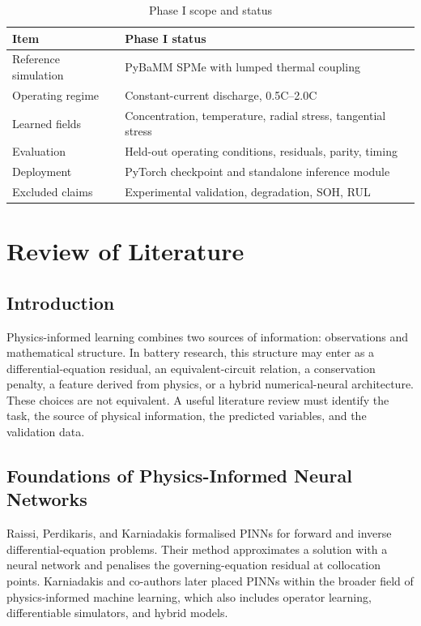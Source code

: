 \documentclass[14pt,a4paper,oneside]{extreport}
\begin{document}
\begin{table}[htbp]
\centering
\caption{Phase I scope and status}
\small
\begin{tabularx}{\textwidth}{p{}X}
\toprule
Item & Phase I status\\
\midrule
Reference simulation & PyBaMM SPMe with lumped thermal coupling\\
Operating regime & Constant-current discharge, 0.5C--2.0C\\
Learned fields & Concentration, temperature, radial stress, tangential stress\\
Evaluation & Held-out operating conditions, residuals, parity, timing\\
Deployment & PyTorch checkpoint and standalone inference module\\
Excluded claims & Experimental validation, degradation, SOH, RUL\\
\bottomrule
\end{tabularx}
\end{table}

\chapter{Review of Literature}
\section{Introduction}
Physics-informed learning combines two sources of information: observations and mathematical structure. In battery research, this structure may enter as a differential-equation residual, an equivalent-circuit relation, a conservation penalty, a feature derived from physics, or a hybrid numerical-neural architecture. These choices are not equivalent. A useful literature review must identify the task, the source of physical information, the predicted variables, and the validation data.

\section{Foundations of Physics-Informed Neural Networks}
Raissi, Perdikaris, and Karniadakis formalised PINNs for forward and inverse differential-equation problems. Their method approximates a solution with a neural network and penalises the governing-equation residual at collocation points. Karniadakis and co-authors later placed PINNs within the broader field of physics-informed machine learning, which also includes operator learning, differentiable simulators, and hybrid models.
\end{document}
